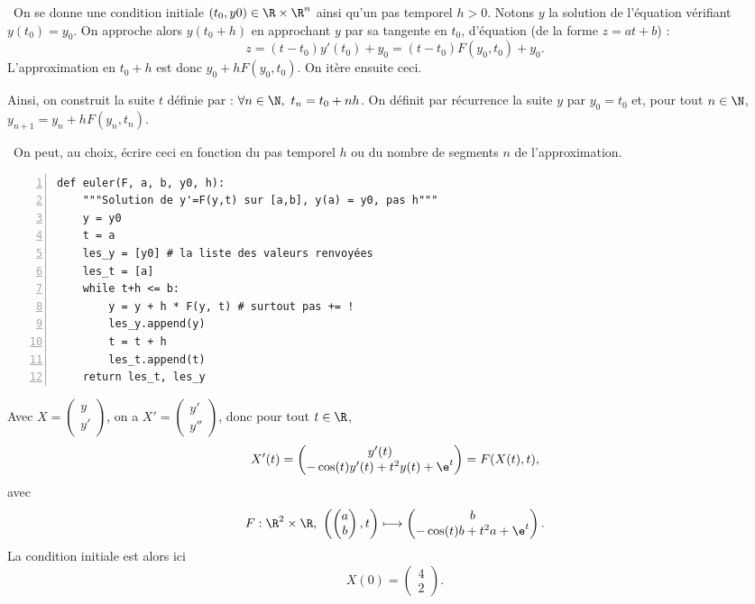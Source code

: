 \question\ On se donne une condition initiale $(t_0,y0) \in \R\times \R^n$ ainsi qu'un pas temporel $h>0$. Notons $y$ la solution de l'équation vérifiant $y(t_0) = y_0$. 
On approche alors $y(t_0+h)$ en approchant $y$ par sa tangente en $t_0$, d'équation (de la forme $z = at+b$) : 
\begin{equation*}
  z = (t-t_0)y'(t_0) + y_0 = (t-t_0)F(y_0,t_0)  + y_0. 
\end{equation*}
L'approximation en $t_0+h$ est donc $y_0 + hF(y_0,t_0)$. On itère ensuite ceci. 

Ainsi, on construit la suite $t$ définie par : $\forall n \in \N,~ t_n = t_0 + nh$. On définit par récurrence la suite $y$ par $y_0 = t_0$ et, pour tout $n\in \N$, $y_{n+1} = y_n + h F(y_n,t_n)$. 

\question\ On peut, au choix, écrire ceci en fonction du pas temporel $h$ ou du nombre de segments $n$ de l'approximation. 

\begin{Verbatim}[gobble=0,numbers=left]
def euler(F, a, b, y0, h):
    """Solution de y'=F(y,t) sur [a,b], y(a) = y0, pas h"""
    y = y0
    t = a
    les_y = [y0] # la liste des valeurs renvoyées
    les_t = [a]
    while t+h <= b:
        y = y + h * F(y, t) # surtout pas += !
        les_y.append(y)
        t = t + h
        les_t.append(t)
    return les_t, les_y
\end{Verbatim}

\question Avec $X = \begin{pmatrix} y \\ y' \end{pmatrix}$, on a $X' = \begin{pmatrix} y' \\ y'' \end{pmatrix}$, donc pour tout $t\in \R$,
\begin{equation*}
  X'(t) = \begin{pmatrix} y'(t) \\-\cos(t)y'(t) + t^2y(t) + \e^t  \end{pmatrix} = F(X(t),t),
\end{equation*}
avec 
\begin{equation*}
  F : \R^2 \times \R,~ \left( \begin{pmatrix} a \\ b \end{pmatrix} , t \right) \longmapsto  \begin{pmatrix} b \\-\cos(t)b + t^2a + \e^t  \end{pmatrix}.
\end{equation*}
La condition initiale est alors ici 
\begin{equation*}
  X(0) = \begin{pmatrix} 4 \\ 2 \end{pmatrix}.
\end{equation*}

